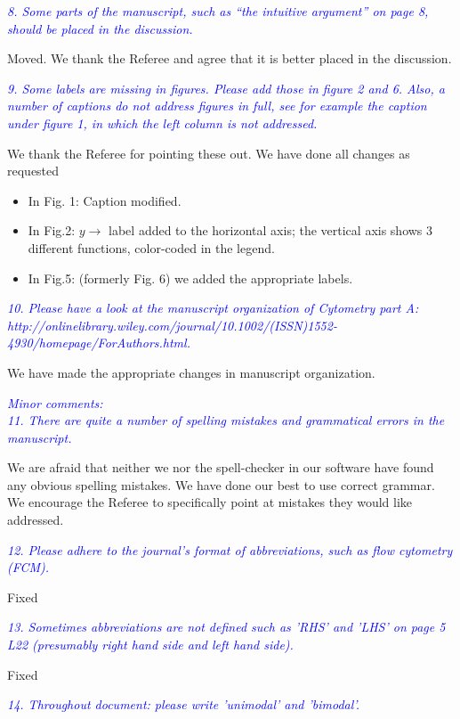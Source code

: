 \documentclass[letter,11pt,draft]{article}
\newcommand{\re}[1]{\emph{\textcolor{blue}{#1}}}
\begin{document}
\re{
8. Some parts of the manuscript, such as “the intuitive argument” on page 8, should be placed in the discussion.}

\smallskip
Moved. We thank the Referee and agree that it is better placed in the discussion.

\re{
9. Some labels are missing in figures. Please add those in figure 2 and 6. Also, a number of captions do not address figures in full, see for example the caption under figure 1, in which the left column is not addressed.}

\smallskip
We thank the Referee for pointing these out. We have done all changes as requested

\smallskip
\begin{itemize}
\item In Fig. 1: Caption  modified.
\item In Fig.2: $y\longrightarrow$ label added to the horizontal axis; the vertical axis shows 3 different functions, color-coded in the legend.
\item In Fig.5: (formerly Fig. 6) we added the appropriate labels.
\end{itemize}

\re{
10. Please have a look at the manuscript organization of Cytometry part A: http://onlinelibrary.wiley.com/journal/10.1002/(ISSN)1552-4930/homepage/ForAuthors.html.
}

\smallskip
We have made the appropriate changes in manuscript organization. 

\smallskip
\re{
Minor comments:
\\
11. There are quite a number of spelling mistakes and grammatical errors in the manuscript.}

\smallskip
We are afraid that neither we nor the spell-checker in our software have found any obvious spelling mistakes. We have done our best to use correct grammar. We encourage the Referee to specifically point at mistakes they would like addressed.

\re{
12. Please adhere to the journal's format of abbreviations, such as flow cytometry (FCM).}

\smallskip
Fixed

\re{
13. Sometimes abbreviations are not defined such as 'RHS' and 'LHS' on page 5 L22 (presumably right hand side and left hand side).}

\smallskip
Fixed

\re{
14. Throughout document: please write 'unimodal' and 'bimodal'.
}
\end{document}
